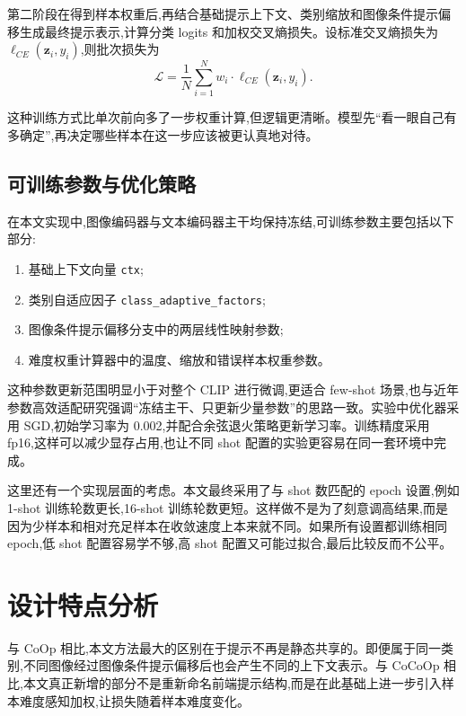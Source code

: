 第二阶段在得到样本权重后,再结合基础提示上下文、类别缩放和图像条件提示偏移生成最终提示表示,计算分类 logits 和加权交叉熵损失。设标准交叉熵损失为 \(\ell_{CE}(\mathbf{z}_i, y_i)\),则批次损失为
\begin{equation}
\mathcal{L} = \frac{1}{N}\sum_{i=1}^{N} w_i \cdot \ell_{CE}(\mathbf{z}_i, y_i).
\end{equation}

这种训练方式比单次前向多了一步权重计算,但逻辑更清晰。模型先“看一眼自己有多确定”,再决定哪些样本在这一步应该被更认真地对待。

\subsection{可训练参数与优化策略}

在本文实现中,图像编码器与文本编码器主干均保持冻结,可训练参数主要包括以下部分:

\begin{enumerate}
\item 基础上下文向量 \texttt{ctx};
\item 类别自适应因子 \texttt{class\_adaptive\_factors};
\item 图像条件提示偏移分支中的两层线性映射参数;
\item 难度权重计算器中的温度、缩放和错误样本权重参数。
\end{enumerate}

这种参数更新范围明显小于对整个 CLIP 进行微调,更适合 few-shot 场景,也与近年参数高效适配研究强调“冻结主干、只更新少量参数”的思路一致\cite{xu2023fewshotvit}。实验中优化器采用 SGD,初始学习率为 0.002,并配合余弦退火策略更新学习率。训练精度采用 fp16,这样可以减少显存占用,也让不同 shot 配置的实验更容易在同一套环境中完成。

这里还有一个实现层面的考虑。本文最终采用了与 shot 数匹配的 epoch 设置,例如 1-shot 训练轮数更长,16-shot 训练轮数更短。这样做不是为了刻意调高结果,而是因为少样本和相对充足样本在收敛速度上本来就不同。如果所有设置都训练相同 epoch,低 shot 配置容易学不够,高 shot 配置又可能过拟合,最后比较反而不公平。

\section{设计特点分析}

与 CoOp 相比,本文方法最大的区别在于提示不再是静态共享的。即便属于同一类别,不同图像经过图像条件提示偏移后也会产生不同的上下文表示。与 CoCoOp 相比,本文真正新增的部分不是重新命名前端提示结构,而是在此基础上进一步引入样本难度感知加权,让损失随着样本难度变化。

